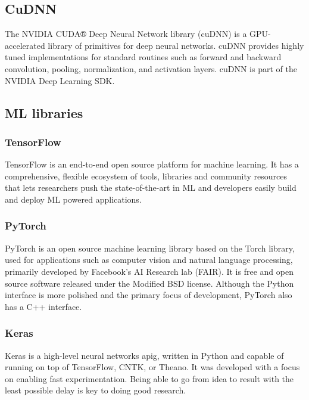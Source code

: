 \subsection*{CuDNN}\label{subsec:cudnn}
The NVIDIA CUDA® Deep Neural Network library (cuDNN) is a GPU-accelerated library
of primitives for deep neural networks.
cuDNN provides highly tuned implementations for standard routines such as forward and backward convolution,
pooling, normalization, and activation layers. 
cuDNN is part of the NVIDIA Deep Learning SDK.\@
\subsection*{ML libraries}\label{subsec:mllib}
\subsubsection*{TensorFlow}\label{subsubsec:tensorflow}
TensorFlow is an end-to-end open source platform for machine learning. It has a
comprehensive, flexible ecosystem of tools, libraries and community resources
that lets researchers push the state-of-the-art in ML and developers easily
build and deploy ML powered applications.
\subsubsection*{PyTorch}\label{subsubsec:pytorch}
PyTorch is an open source machine learning library based on the Torch library,
used for applications such as computer vision and natural language processing,
primarily developed by Facebook's AI Research lab (FAIR). It is free and open
source software released under the Modified BSD license. Although the Python
interface is more polished and the primary focus of development, PyTorch also
has a C++ interface.
\subsubsection*{Keras}\label{subsubsec:keras}
Keras is a high-level neural networks \gls{apig}, written in Python and capable of
running on top of TensorFlow, CNTK, or Theano. It was developed with a focus on
enabling fast experimentation. Being able to go from idea to result with the
least possible delay is key to doing good research.
